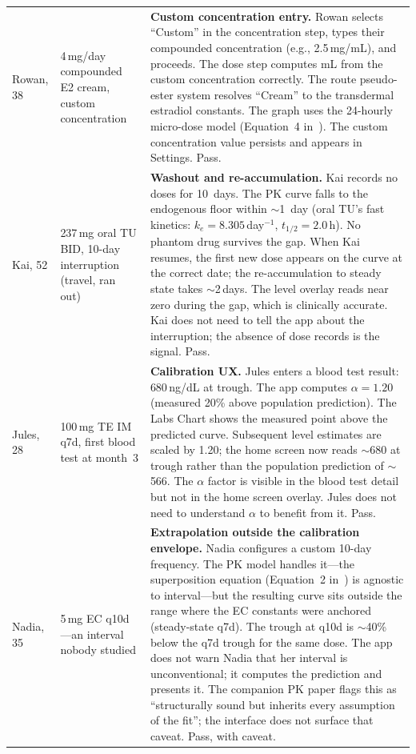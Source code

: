 \documentclass[11pt,a4paper]{article}
\newcommand{\good}[1]{#1}
\begin{document}
\begin{longtable}{@{}p{2.6cm}p{4.5cm}p{7.4cm}@{}}
Rowan, 38 & 4\,mg/day compounded E2 cream, custom concentration
 & \textbf{Custom concentration entry.} Rowan selects ``Custom'' in the
   concentration step, types their compounded concentration (e.g.,
   2.5\,mg/mL), and proceeds. The dose step computes mL from the custom
   concentration correctly. The route pseudo-ester system resolves
   ``Cream'' to the transdermal estradiol constants. The graph uses the
   24-hourly micro-dose model (Equation~4 in~\cite{xtpk}). The custom
   concentration value persists and appears in Settings.
   \good{Pass.} \\[0.4em]

Kai, 52 & 237\,mg oral TU BID, 10-day interruption (travel, ran out)
 & \textbf{Washout and re-accumulation.} Kai records no doses for
   10~days. The PK curve falls to the endogenous floor within $\sim$1~day
   (oral TU's fast kinetics: $k_e = 8.305$\,day$^{-1}$, $t_{1/2} =
   2.0$\,h). No phantom drug survives the gap. When Kai resumes, the
   first new dose appears on the curve at the correct date; the
   re-accumulation to steady state takes $\sim$2\,days. The level overlay
   reads near zero during the gap, which is clinically accurate. Kai does
   not need to tell the app about the interruption; the absence of dose
   records is the signal. \good{Pass.} \\[0.4em]

Jules, 28 & 100\,mg TE IM q7d, first blood test at month~3
 & \textbf{Calibration UX.} Jules enters a blood test result:
   680\,ng/dL at trough. The app computes $\alpha = 1.20$ (measured
   20\% above population prediction). The Labs Chart shows the measured
   point above the predicted curve. Subsequent level estimates are scaled
   by 1.20; the home screen now reads $\sim$680 at trough rather than the
   population prediction of $\sim$566. The $\alpha$ factor is visible in
   the blood test detail but not in the home screen overlay. Jules does
   not need to understand $\alpha$ to benefit from it. \good{Pass.}
   \\[0.4em]

Nadia, 35 & 5\,mg EC q10d---an interval nobody studied
 & \textbf{Extrapolation outside the calibration envelope.} Nadia
   configures a custom 10-day frequency. The PK model handles it---the
   superposition equation (Equation~2 in~\cite{xtpk}) is agnostic to
   interval---but the resulting curve sits outside the range where the
   EC constants were anchored (steady-state q7d). The trough at q10d is
   $\sim$40\% below the q7d trough for the same dose. The app does not
   warn Nadia that her interval is unconventional; it computes the
   prediction and presents it. The companion PK paper flags this as
   ``structurally sound but inherits every assumption of the fit'';
   the interface does not surface that caveat. \good{Pass, with caveat.}
   \\[0.4em]
\bottomrule
\end{longtable}
\end{document}
